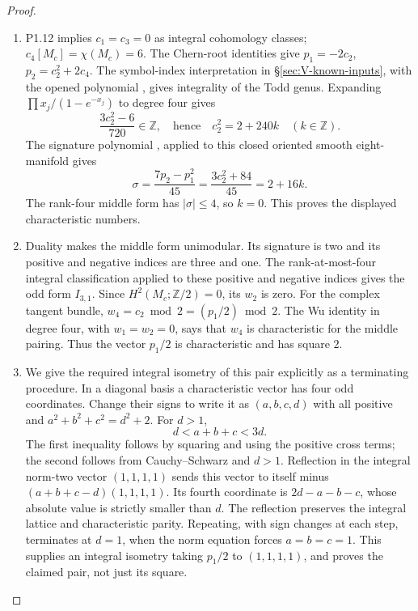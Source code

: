 \begin{proof}
\begin{enumerate}[label=\arabic*.]
\item P1.12 implies $c_1=c_3=0$ as integral cohomology classes;
$c_4[M_c]=\chi(M_c)=6$.  The Chern-root identities give
$p_1=-2c_2$, $p_2=c_2^2+2c_4$.
The symbol-index interpretation in \S\ref{sec:V-known-inputs},
with the opened polynomial \cite[equation (1.2), p.~3]{ffEsoleKang},
gives integrality of the Todd genus. Expanding
$\prod x_j/(1-e^{-x_j})$ to degree four gives
\[
\frac{3c_2^2-6}{720}\in\mathbb Z,
\quad\text{hence}\quad c_2^2=2+240k\quad(k\in\mathbb Z).
\]
The signature polynomial \cite[equation (1.4), p.~4]{ffEsoleKang}, applied to
this closed oriented smooth eight-manifold gives
\[
\sigma=\frac{7p_2-p_1^2}{45}
      =\frac{3c_2^2+84}{45}=2+16k.
\]
The rank-four middle form has $|\sigma|\leq4$, so $k=0$.
This proves the displayed characteristic numbers.

\item Duality makes the middle form unimodular.  Its signature is two and
its positive and negative indices are three and one.  The rank-at-most-four integral classification
\cite[Theorem 2.2.1, p.~61]{ffPetersSterk} applied to these
positive and negative indices gives the odd form \(I_{3,1}\).
Since $H^2(M_c;\mathbb Z/2)=0$, its $w_2$ is zero.
For the complex tangent bundle,
$w_4=c_2\bmod2=(p_1/2)\bmod2$.
The Wu identity in degree four, with $w_1=w_2=0$, says that $w_4$ is
characteristic for the middle pairing.  Thus the vector $p_1/2$ is
characteristic and has square $2$.

\item We give the required integral isometry of this pair explicitly as
a terminating procedure.  In a diagonal basis a characteristic vector
has four odd coordinates.  Change their signs to write it as
$(a,b,c,d)$ with all positive and
$a^2+b^2+c^2=d^2+2$.
For $d>1$,
\[
d<a+b+c<3d.
\]
The first inequality follows by squaring and using the positive cross
terms; the second follows from Cauchy--Schwarz and $d>1$.
Reflection in the integral norm-two vector $(1,1,1,1)$ sends this
vector to itself minus $(a+b+c-d)(1,1,1,1)$.
Its fourth coordinate is $2d-a-b-c$, whose absolute value is strictly
smaller than $d$.  The reflection preserves the integral lattice and
characteristic parity.  Repeating, with sign changes at each step,
terminates at $d=1$, when the norm equation forces $a=b=c=1$.
This supplies an integral isometry taking $p_1/2$ to $(1,1,1,1)$,
and proves the claimed pair, not just its square.

\end{enumerate}
\end{proof}




